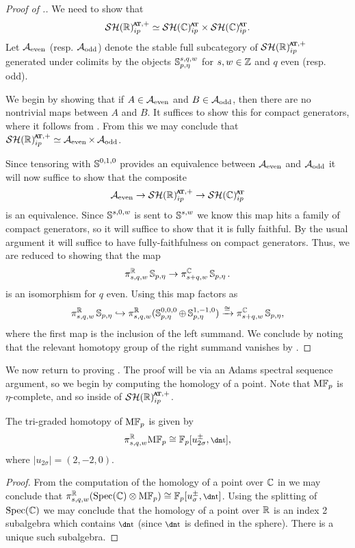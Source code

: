 \begin{proof}[Proof of .]
  We need to show that
  \[ \SHR_{ip}^{\at,+} \simeq \SHCat \times \SHCat. \]
  Let $\operatorname{\mathcal{A}}_{\mathrm{even}}$ (resp. $\operatorname{\mathcal{A}}_{\mathrm{odd}}$) denote the stable full subcategory of $\SHR_{ip}^{\at,+}$ generated under colimits by the objects $\operatorname{\mathbb{S}}_{p,\eta}^{s,q,w}$ for $s,w \in \mathbb{Z}$ and $q$ even  (resp. odd).
  
  We begin by showing that if $A \in \operatorname{\mathcal{A}}_{\mathrm{even}}$ and $B \in \operatorname{\mathcal{A}}_{\mathrm{odd}}$, then there are no nontrivial maps between $A$ and $B$. It suffices to show this for compact generators, where it follows from . From this we may conclude that $\SHR_{ip}^{\at,+} \simeq \A_{\mathrm{even}} \times \A_{\mathrm{odd}}$.

  Since tensoring with $\operatorname{\mathbb{S}}^{0,1,0}$ provides an equivalence between $\operatorname{\mathcal{A}}_{\mathrm{even}}$ and $\operatorname{\mathcal{A}}_{\mathrm{odd}}$ it will now suffice to show that the composite
  \[ \A_{\mathrm{even}} \to \SHR^{\at,+}_{ip} \to \SHCat \]
  is an equivalence. Since $\operatorname{\mathbb{S}}^{s,0,w}$ is sent to $\operatorname{\mathbb{S}}^{s,w}$ we know this map hits a family of compact generators, so it will suffice to show that it is fully faithful. By the usual argument it will suffice to have fully-faithfulness on compact generators. Thus, we are reduced to showing that the map
  \[ \pi_{s,q,w}^{\mathbb{R}}\operatorname{\mathbb{S}}_{p,\eta} \to \pi_{s+q,w}^{\mathbb{C}}\operatorname{\mathbb{S}}_{p,\eta}. \]
  is an isomorphism for $q$ even. Using  this map factors as
  \[ \pi_{s,q,w}^{\mathbb{R}}\operatorname{\mathbb{S}}_{p,\eta} \hookrightarrow \pi_{s,q,w}^{\mathbb{R}}( \operatorname{\mathbb{S}}_{p,\eta}^{0,0,0} \oplus \operatorname{\mathbb{S}}_{p,\eta}^{1,-1,0} ) \xrightarrow{\cong} \pi_{s+q,w}^{\mathbb{C}}\operatorname{\mathbb{S}}_{p,\eta}, \]
  where the first map is the inclusion of the left summand.
  We conclude by noting that the relevant homotopy group of the right summand vanishes by .
\end{proof}

We now return to proving .
The proof will be via an Adams spectral sequence argument, so we begin by computing the homology of a point. Note that $\mathrm{M}\mathbb{F}_p$ is $\eta$-complete, and so inside of $\SHR_{ip}^{\at,+}$.

\begin{lem}\label{lem:odd-pt}
  The tri-graded homotopy of $\mathrm{M}\mathbb{F}_p$ is given by
  \[ \pi_{s,q,w}^\R \MFp \cong \F_p[u_{2\sigma}^{\pm}, \ta], \]
  where $|u_{2\sigma}| = (2,-2,0)$.
\end{lem}

\begin{proof}
  From the computation of the homology of a point over $\mathbb{C}$ in \cite{Voe03} we may conclude that $\pi_{s,q,w}^\R(\Spec(\C) \otimes \MFp) \cong \F_p[u_\sigma^{\pm}, \ta]$. Using the splitting of $\operatorname{\mathrm{Spec}}(\mathbb{C})$ we may conclude that the homology of a point over $\mathbb{R}$ is an index 2 subalgebra which contains $\ta$ (since $\ta$ is defined in the sphere). There is a unique such subalgebra.
\end{proof}

